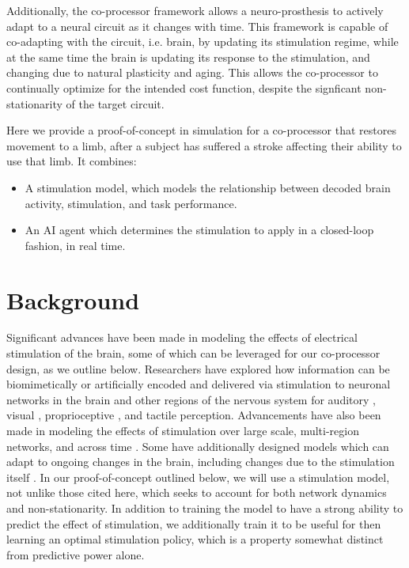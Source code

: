 \documentclass[12pt]{iopart}
\begin{document}
Additionally, the co-processor framework allows a neuro-prosthesis to actively adapt to
a neural circuit as it changes with time. This framework is capable of co-adapting with
the circuit, i.e. brain, by updating its stimulation regime, while at the same time the
brain is updating its response to the stimulation, and changing due to natural plasticity
and aging. This allows the co-processor to continually optimize for the intended cost
function, despite the signficant non-stationarity of the target circuit.

Here we provide a proof-of-concept in simulation for a co-processor that restores
movement to a limb, after a subject has suffered a stroke affecting their ability to
use that limb. It combines:
\begin{itemize}
	\item A stimulation model, which models the relationship between decoded brain activity,
	      stimulation, and task performance.
	\item An AI agent which determines the stimulation to apply in a closed-loop fashion, in real time.
\end{itemize}

\section{Background}
Significant advances have been made in modeling the effects of electrical stimulation
of the brain, some of which can be leveraged for our co-processor design, as we outline
below. Researchers have explored how information can be biomimetically or
artificially encoded and delivered via stimulation to neuronal networks in the brain and
other regions of the nervous system for auditory \cite{niparko.cochlear}, visual \cite{weiland.retinal},
proprioceptive \cite{tomlinson.propr}, and tactile
\cite{tabot.tact, tyler.tact, dadarlat.tact, sharlene.tact, cronin.tact} perception.
Advancements have also been made in modeling the effects of stimulation over large scale, multi-region
networks, and across time \cite{shanechi.stimmodel}. Some have additionally designed models which
can adapt to ongoing changes in the brain, including changes due to the stimulation itself
\cite{tafazoli.acls}. In our proof-of-concept outlined below, we will use a stimulation
model, not unlike those cited here, which seeks to account for both network dynamics
and non-stationarity. In addition to training the model to have a strong ability to predict
the effect of stimulation, we additionally train it to be useful for then learning an
optimal stimulation policy, which is a property somewhat distinct from predictive
power alone.
\end{document}
